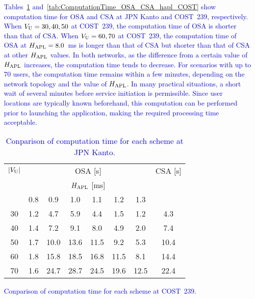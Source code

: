\documentclass[10pt, letterpaper]{IEEEtran}
\newcommand\blue[1]{\textcolor{blue}{#1}}
\begin{document}
\begin{CJK}{UTF8}{ipxm}
\blue{
Tables~\ref{tab:ComputationTime_OSA_CSA_hapl_JPN} and~\ref{tab:ComputationTime_OSA_CSA_hapl_COST} show computation time for OSA and CSA at JPN Kanto and COST~239, respectively.
When $V_{\rm U} = 30, 40, 50$ at COST~239, the computation time of OSA is shorter than that of CSA.
When $V_{\rm U} = 60, 70$ at COST~239, the computation time of OSA at $H_{\rm APL} = 8.0$~ms is longer than that of CSA but shorter than that of CSA at other $H_{\rm APL}$ values.
In both networks, as the difference from a certain value of $H_{\rm APL}$ increases, the computation time tends to decrease.
For scenarios with up to 70 users, the computation time remains within a few minutes, depending on the network topology and the value of $H_{\rm APL}$. 
In many practical situations, a short wait of several minutes before service initiation is permissible.
Since user locations are typically known beforehand, this computation can be performed prior to launching the application, making the required processing time acceptable.
}
\begin{table}[t]
  \caption{\blue{Conparison of computation time for each scheme at JPN Kanto.}}
  \label{tab:ComputationTime_OSA_CSA_hapl_JPN}
  \begin{center}
    \begin{tabular}{c|cccccc|c}
      \hline
      $|V_{\rm{U}}|$ & \multicolumn{6}{c|}{OSA [s]} & CSA [s] \\ \cline{2-7}
       & \multicolumn{6}{c|}{$H_{\rm{APL}}$ [ms]} & \\
       & 0.8 & 0.9 & 1.0 & 1.1 & 1.2 & 1.3 &  \\
      \hline
      30 & 1.2 &  4.7 &  5.9 &  4.4 &  1.5 &  1.2 &  4.3 \\
      40 & 1.4 &  7.2 &  9.1 &  8.0 &  4.9 &  2.0 &  7.4 \\
      50 & 1.7 & 10.0 & 13.6 & 11.5 &  9.2 &  5.3 & 10.4 \\
      60 & 1.8 & 15.8 & 18.5 & 16.8 & 11.5 &  8.1 & 14.4 \\
      70 & 1.6 & 24.7 & 28.7 & 24.5 & 19.6 & 12.5 & 22.4 \\
      \hline
    \end{tabular}
  \end{center}
\end{table}
\begin{table}[t]
  \caption{\blue{Conparison of computation time for each scheme at COST~239.}}
  \label{tab:ComputationTime_OSA_CSA_hapl_COST}

\end{table}
\end{CJK}
\end{document}
